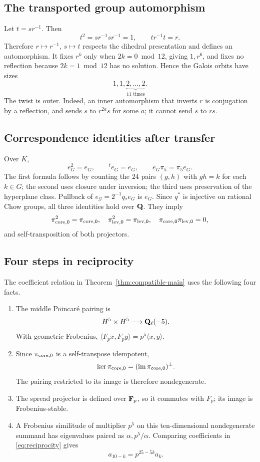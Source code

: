 \subsection{The transported group automorphism}

Let \(t=sr^{-1}\).  Then
\[
t^2=sr^{-1}sr^{-1}=1,\qquad
t r^{-1}t=r.
\]
Therefore \(r\mapsto r^{-1}\), \(s\mapsto t\) respects the dihedral
presentation and defines an automorphism.  It fixes \(r^k\) only when
\(2k=0\bmod12\), giving \(1,r^6\), and fixes no reflection because
\(2k=1\bmod12\) has no solution.  Hence the Galois orbits have sizes
\[
1,1,\underbrace{2,\ldots,2}_{11\text{ times}}.
\]
The twist is outer.  Indeed, an inner automorphism that inverts \(r\)
is conjugation by a reflection, and sends \(s\) to \(r^{2a}s\) for some
\(a\); it cannot send \(s\) to \(rs\).

\subsection{Correspondence identities after transfer}

Over \(K\),
\[
e_G^2=e_G,\qquad {}^te_G=e_G,\qquad e_G\pi_5=\pi_5e_G.
\]
The first formula follows by counting the \(24\) pairs \((g,h)\) with
\(gh=k\) for each \(k\in G\); the second uses closure under inversion;
the third uses preservation of the hyperplane class.  Pullback of
\(e_{\mathscr G}=2^{-1}q_*e_G\) is \(e_G\).  Since \(q^*\) is injective
on rational Chow groups, all three identities hold over \(\mathbf Q\).
They imply
\[
\pi_{\mathrm{core},0}^2=\pi_{\mathrm{core},0},\quad
\pi_{\mathrm{lev},0}^2=\pi_{\mathrm{lev},0},\quad
\pi_{\mathrm{core},0}\pi_{\mathrm{lev},0}=0,
\]
and self-transposition of both projectors.

\subsection{Four steps in reciprocity}

The coefficient relation in Theorem~\ref{thm:compatible-main} uses the
following four facts.

\begin{enumerate}[leftmargin=*]
\item The middle Poincar\'e pairing is
\[
H^5\times H^5\longrightarrow\mathbf Q_\ell(-5).
\]
With geometric Frobenius,
\(\langle F_px,F_py\rangle=p^5\langle x,y\rangle\).
\item Since \(\pi_{\mathrm{core},0}\) is a self-transpose idempotent,
\[
\ker\pi_{\mathrm{core},0}=(\operatorname{im}\pi_{\mathrm{core},0})^\perp.
\]
The pairing restricted to its image is therefore nondegenerate.
\item The spread projector is defined over \(\mathbf F_p\), so it commutes with
\(F_p\); its image is Frobenius-stable.
\item A Frobenius similitude of multiplier \(p^5\) on this
ten-dimensional nondegenerate summand has eigenvalues paired as
\(\alpha,p^5/\alpha\).  Comparing coefficients in
\eqref{eq:reciprocity} gives
\[
a_{10-k}=p^{25-5k}a_k.
\]
\end{enumerate}

